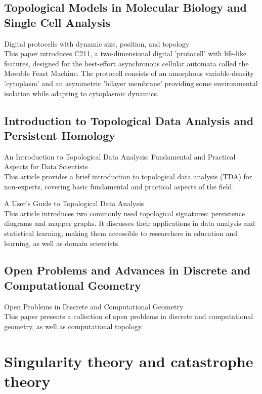 \documentclass{article}
\begin{document}
\subsection{Topological Models in Molecular Biology and Single Cell Analysis}

\cite{Ackley2018DigitalPW} Digital protocells with dynamic size, position, and topology \\
This paper introduces C211, a two-dimensional digital 'protocell' with life-like features, designed for the best-effort asynchronous cellular automata called the Movable Feast Machine. The protocell consists of an amorphous variable-density 'cytoplasm' and an asymmetric 'bilayer membrane' providing some environmental isolation while adapting to cytoplasmic dynamics.

\subsection{Introduction to Topological Data Analysis and Persistent Homology}

\cite{Chazal2017AnIT} An Introduction to Topological Data Analysis: Fundamental and Practical Aspects for Data Scientists \\
This article provides a brief introduction to topological data analysis (TDA) for non-experts, covering basic fundamental and practical aspects of the field.

\cite{Munch2017AUG} A User's Guide to Topological Data Analysis \\
This article introduces two commonly used topological signatures: persistence diagrams and mapper graphs. It discusses their applications in data analysis and statistical learning, making them accessible to researchers in education and learning, as well as domain scientists.

\subsection{Open Problems and Advances in Discrete and Computational Geometry}

\cite{Edelsbrunner2012OpenPI} Open Problems in Discrete and Computational Geometry \\
This paper presents a collection of open problems in discrete and computational geometry, as well as computational topology.


\section{Singularity theory and catastrophe theory}
\end{document}
